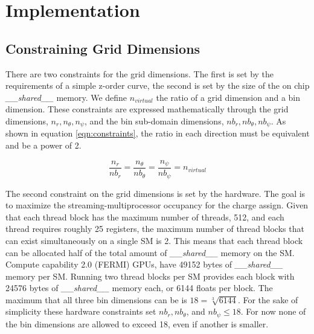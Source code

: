 \chapter{Implementation} 
\label{ch:implementation}
	\section{Constraining Grid Dimensions}
	\label{sec:grid_constraints}
There are two constraints for the grid dimensions. The first is set by the requirements of a simple z-order curve, the second is set by the size of the on chip \emph{\_\_shared\_\_} memory. We define $n_{virtual}$ the ratio of a grid dimension and a bin dimension. These constraints are expressed mathematically through the grid dimensions, $n_r, n_{\theta}, n_{\psi}$, and the bin sub-domain dimensions, $nb_r, nb_{\theta}, nb_{\psi}$. As shown in equation \ref{eqn:constraints}, the ratio in each direction must be equivalent and be a power of 2.
		
\begin{equation}
\frac{n_r}{nb_r} = \frac{n_{\theta}}{nb_{\theta}} = \frac{n_{\psi}}{nb_{\psi}} = n_{virtual}
\label{eqn:constraints}
\end{equation} 



The second constraint on the grid dimensions is set by the hardware. The goal is to maximize the streaming-multiprocessor occupancy for the charge assign. Given that each thread block has the maximum number of threads, 512, and each thread requires roughly 25 registers, the maximum number of thread blocks that can exist simultaneously on a single SM is 2. This means that each thread block can be allocated half of the total amount of \emph{\_\_shared\_\_} memory on the SM. Compute capability 2.0 (FERMI) GPUs, have 49152 bytes of \emph{\_\_shared\_\_} memory per SM. Running two thread blocks per SM provides each block with 24576 bytes of \emph{\_\_shared\_\_} memory each, or 6144 floats per block. The maximum that all three bin dimensions can be is $18 = \sqrt[3]{6144}$. For the sake of simplicity these hardware constraints set $nb_r, nb_{\theta}$, and $nb_{\psi} \le 18$. For now none of the bin dimensions are allowed to exceed 18, even if another is smaller. 


